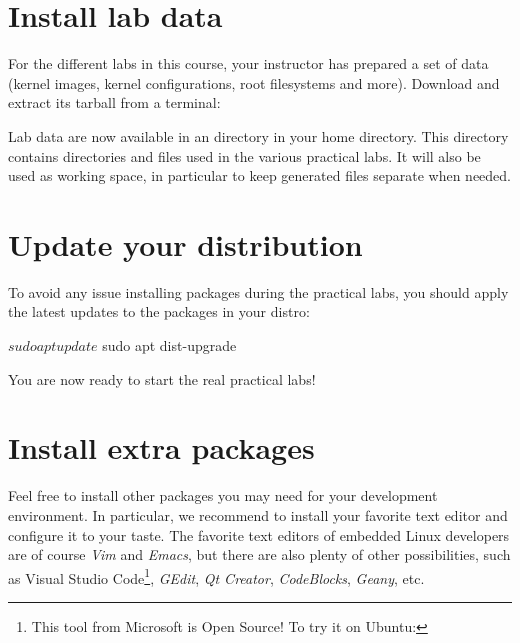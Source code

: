 
\section{Install lab data}

For the different labs in this course, your instructor has prepared a
set of data (kernel images, kernel configurations, root filesystems
and more). Download and extract its tarball from a terminal:

{\small
{}
}

Lab data are now available in an  directory in
your home directory. This directory contains directories and files used in
the various practical labs. It will also be used as working space,
in particular to keep generated files separate when needed.

\section{Update your distribution}

To avoid any issue installing packages during the practical labs,
you should apply the latest updates to the packages in your distro:

\begin{bashinput}
$ sudo apt update
$ sudo apt dist-upgrade
\end{bashinput}

You are now ready to start the real practical labs!

\section{Install extra packages}

Feel free to install other packages you may need for your development
environment. In particular, we recommend to install your favorite text
editor and configure it to your taste. The favorite text editors of
embedded Linux developers are of course {\em Vim} and {\em Emacs}, but
there are also plenty of other possibilities, such as {Visual Studio
Code}\footnote{This tool from Microsoft is Open Source! To try it on
Ubuntu: }, {\em GEdit},
{\em Qt Creator}, {\em CodeBlocks}, {\em Geany}, etc.

